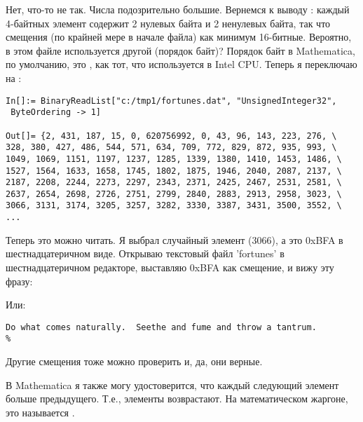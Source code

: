 Нет, что-то не так. Числа подозрительно большие.
Вернемся к выводу : каждый 4-байтных элемент содержит 2 нулевых байта и 2 ненулевых байта,
так что смещения (по крайней мере в начале файла) как минимум 16-битные.
Вероятно, в этом файле используется другой  (порядок байт)?
Порядок байт в Mathematica, по умолчанию, это , как тот, что используется в Intel CPU.
Теперь я переключаю на :

\begin{lstlisting}[style=custommath]
In[]:= BinaryReadList["c:/tmp1/fortunes.dat", "UnsignedInteger32", 
 ByteOrdering -> 1]

Out[]= {2, 431, 187, 15, 0, 620756992, 0, 43, 96, 143, 223, 276, \
328, 380, 427, 486, 544, 571, 634, 709, 772, 829, 872, 935, 993, \
1049, 1069, 1151, 1197, 1237, 1285, 1339, 1380, 1410, 1453, 1486, \
1527, 1564, 1633, 1658, 1745, 1802, 1875, 1946, 2040, 2087, 2137, \
2187, 2208, 2244, 2273, 2297, 2343, 2371, 2425, 2467, 2531, 2581, \
2637, 2654, 2698, 2726, 2751, 2799, 2840, 2883, 2913, 2958, 3023, \
3066, 3131, 3174, 3205, 3257, 3282, 3330, 3387, 3431, 3500, 3552, \
...
\end{lstlisting}

Теперь это можно читать.
Я выбрал случайный элемент (3066), а это 0xBFA в шестнадцатеричном виде.
Открываю текстовый файл 'fortunes' в шестнадцатеричном редакторе, выставляю 0xBFA как смещение, и вижу эту фразу:



Или:

\begin{lstlisting}
Do what comes naturally.  Seethe and fume and throw a tantrum.
%
\end{lstlisting}

Другие смещения тоже можно проверить и, да, они верные.

В Mathematica я также могу удостоверится, что каждый следующий элемент больше предыдущего.
Т.е., элементы возврастают.
На математическом жаргоне, это называется .

